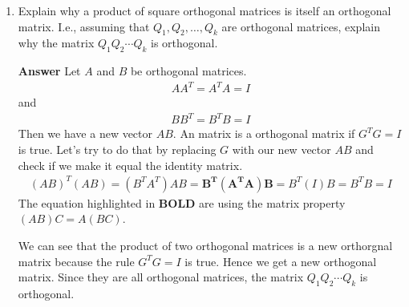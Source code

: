 \documentclass[10pt,a4paper]{article}
\theoremstyle{plain}
\theoremstyle{definition}
\begin{document}
\begin{enumerate}
  \item Explain why a product of square orthogonal matrices is itself an orthogonal matrix.
  I.e., assuming that \(Q_1, Q_2,\dots, Q_k\) are orthogonal matrices, explain why the matrix \(Q_1 Q_2 \cdots Q_k\) is orthogonal.
  \item[\textbf{Answer}]
  Let $A$ and $B$ be orthogonal matrices.
  \begin{align*}
    AA^T=A^TA=I
  \end{align*}
  and
  \begin{align*}
    BB^T=B^TB=I
  \end{align*}
  Then we have a new vector $AB$. An matrix is a orthogonal matrix if $G^TG=I$ is true. Let's try to do that by replacing $G$ with our new vector $AB$ and check if we make it equal the identity matrix.
  \begin{align*}
    (AB)^T(AB)=(B^TA^T)AB=\mathbf{B^T(A^TA)B}=B^T(I)B=B^TB=I
  \end{align*}
  The equation highlighted in \textbf{BOLD} are using the matrix property $(AB)C=A(BC)$.

  We can see that the product of two orthogonal matrices is a new orthorgnal matrix because the rule $G^TG=I$ is true. Hence we get a new orthogonal matrix. Since they are all orthogonal matrices, the matrix $Q_1 Q_2 \cdots Q_k$ is orthogonal.


\end{enumerate}
\end{document}
